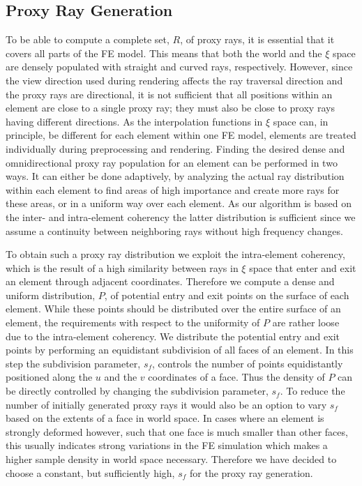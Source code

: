 \documentclass[journal]{vgtc}                %
\begin{document}
\subsection{Proxy Ray Generation}\label{subsec:proxyraygeneration}
To be able to compute a complete set, $R$, of proxy rays, it is essential that it covers all parts of the FE model. This means that both the world and the $\xi$ space are densely populated with straight and curved rays, respectively. However, since the view direction used during rendering affects the ray traversal direction and the proxy rays are directional, it is not sufficient that all positions within an element are close to a single proxy ray; they must also be close to proxy rays having different directions. As the interpolation functions in $\xi$ space can, in principle, be different for each element within one FE model, elements are treated individually during preprocessing and rendering. Finding the desired dense and omnidirectional proxy ray population for an element can be performed in two ways. It can either be done adaptively, by analyzing the actual ray distribution within each element to find areas of high importance and create more rays for these areas, or in a uniform way over each element. As our algorithm is based on the inter- and intra-element coherency the latter distribution is sufficient since we assume a continuity between neighboring rays without high frequency changes.

To obtain such a proxy ray distribution we exploit the intra-element coherency, which is the result of a high similarity between rays in $\xi$ space that enter and exit an element through adjacent coordinates. Therefore we compute a dense and uniform distribution, $P$, of potential entry and exit points on the surface of each element. While these points should be distributed over the entire surface of an element, the requirements with respect to the uniformity of $P$ are rather loose due to the intra-element coherency. We distribute the potential entry and exit points by performing an equidistant subdivision of all faces of an element. In this step the subdivision parameter, $s_f$, controls the number of points equidistantly positioned along the $u$ and the $v$ coordinates of a face. Thus the density of $P$ can be directly controlled by changing the subdivision parameter, $s_f$. To reduce the number of initially generated proxy rays it would also be an option to vary $s_f$ based on the extents of a face in world space. In cases where an element is strongly deformed however, such that one face is much smaller than other faces, this usually indicates strong variations in the FE simulation which makes a higher sample density in world space necessary. Therefore we have decided to choose a constant, but sufficiently high, $s_f$ for the proxy ray generation.
\end{document}
